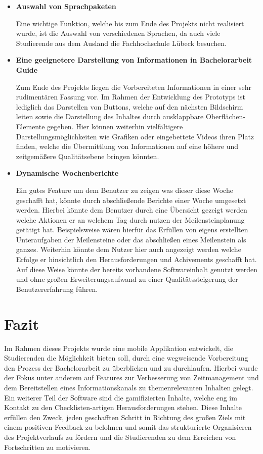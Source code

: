 \documentclass[bibliography=totoc,listof=totoc,BCOR=5mm,DIV=12,oneside]{scrbook}
\begin{document}
{\begin{itemize}
\item \textbf{Auswahl von Sprachpaketen}
\par Eine wichtige Funktion, welche bis zum Ende des Projekts nicht realisiert wurde, ist die Auswahl von verschiedenen Sprachen, da auch viele Studierende aus dem Ausland die Fachhochschule Lübeck besuchen.

\item \textbf{Eine geeignetere Darstellung von Informationen in Bachelorarbeit Guide}
\par Zum Ende des Projekts liegen die Vorbereiteten Informationen in einer sehr rudimentären Fassung vor. Im Rahmen der Entwicklung des Prototyps ist lediglich das Darstellen von Buttons, welche auf den nächsten Bildschirm leiten sowie die Darstellung des Inhaltes durch ausklappbare Oberflächen-Elemente gegeben. Hier können weiterhin vielfältigere Darstellungsmöglichkeiten wie Grafiken oder eingebettete Videos ihren Platz finden, welche die Übermittlung von Informationen auf eine höhere und zeitgemäßere Qualitätsebene bringen könnten.

\item \textbf{Dynamische Wochenberichte}
\par Ein gutes Feature um dem Benutzer zu zeigen was dieser diese Woche geschafft hat, könnte durch abschließende Berichte einer Woche umgesetzt werden. Hierbei könnte dem Benutzer durch eine Übersicht gezeigt werden welche Aktionen er an welchem Tag durch nutzen der Meilensteinplanung getätigt hat. Beispielsweise wären hierfür das Erfüllen von eigens erstellten Unteraufgaben der Meilensteine oder das abschließen eines Meilenstein als ganzes. Weiterhin könnte dem Nutzer hier auch angezeigt werden welche Erfolge er hinsichtlich den Herausforderungen und Achivements geschafft hat. Auf diese Weise könnte der bereits vorhandene Softwareinhalt genutzt werden und ohne großen Erweiterungsaufwand zu einer Qualitätssteigerung der Benutzererfahrung führen.
\end{itemize}

\section{Fazit}
\par Im Rahmen dieses Projekts wurde eine mobile Applikation entwickelt, die Studierenden die Möglichkeit bieten soll, durch eine wegweisende Vorbereitung den Prozess der Bachelorarbeit zu überblicken und zu durchlaufen. Hierbei wurde der Fokus unter anderem auf Features zur Verbesserung von Zeitmanagement und dem Bereitstellen eines Informationskanals zu themenrelevanten Inhalten gelegt. Ein weiterer Teil der Software sind die gamifizierten Inhalte, welche eng im Kontakt zu den Checklisten-artigen Herausforderungen stehen. Diese Inhalte erfüllen den Zweck, jeden geschafften Schritt in Richtung des großen Ziels mit einem positiven Feedback zu belohnen und somit das strukturierte Organisieren des Projektverlaufs zu fördern und die Studierenden zu dem Erreichen von Fortschritten zu motivieren.

}
\end{document}
